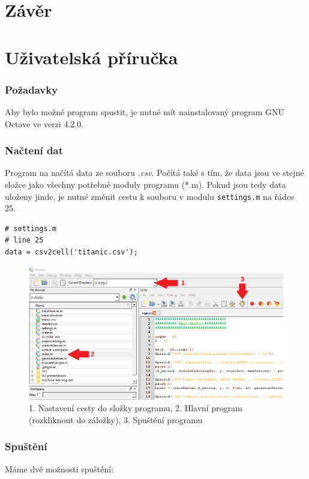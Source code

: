 \documentclass[a4]{article}
\begin{document}
\section{Závěr}

\section{Uživatelská příručka}
\subsubsection{Požadavky}
Aby bylo možné program spustit, je nutné mít nainstalovaný program GNU Octave ve verzi 4.2.0.

\subsubsection{Načtení dat}
Program na načítá data ze souboru \textit{.csv}. Počítá také s tím, že data jsou ve stejné složce jako všechny potřebné moduly programu (*.m). Pokud jsou tedy data uloženy jinde, je nutné změnit cestu k souboru v modulu \texttt{settings.m} na řádce 25.

\begin{lstlisting}
# settings.m
# line 25
data = csv2cell('titanic.csv');
\end{lstlisting}

\begin{figure}[!ht]
	\centering
		\includegraphics[width=\textwidth]{images/runWithGUI}
	\caption{1. Nastavení cesty do složky programu, 2. Hlavní program (rozkliknout do záložky), 3. Spuštění programu}
	\label{fig:runWithGUI}
\end{figure}

\subsubsection{Spuštění}
Máme dvě možnosti spuštění:
\end{document}
